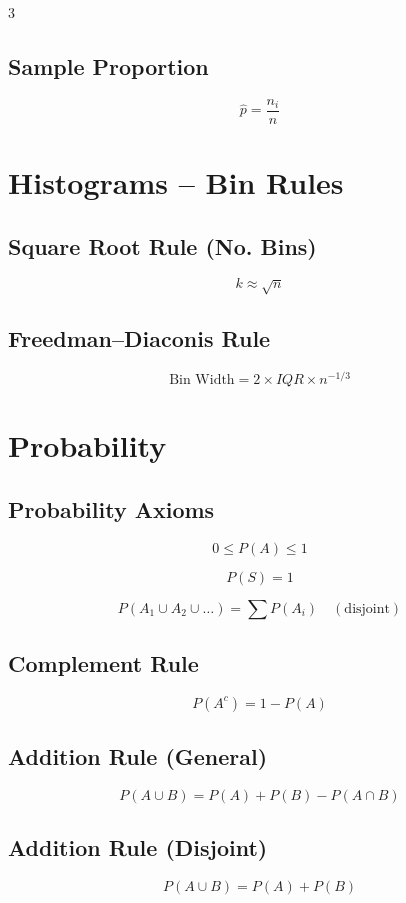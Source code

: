 \documentclass[10pt]{article}
\begin{document}
\begin{multicols}{3}
\subsection*{Sample Proportion}
\[
\hat{p} = \frac{n_i}{n}
\]

\section*{Histograms – Bin Rules}

\subsection*{Square Root Rule (No. Bins)}
\[
k \approx \sqrt{n}
\]

\subsection*{Freedman–Diaconis Rule}
\[
\text{Bin Width} = 2 \times IQR \times n^{-1/3}
\]

\section*{Probability}

\subsection*{Probability Axioms}

\[
0 \le P(A) \le 1
\]

\[
P(S) = 1
\]

\[
P(A_1 \cup A_2 \cup \dots) = \sum P(A_i)
\quad (\text{disjoint})
\]

\subsection*{Complement Rule}
\[
P(A^c) = 1 - P(A)
\]

\subsection*{Addition Rule (General)}
\[
P(A \cup B) = P(A) + P(B) - P(A \cap B)
\]

\subsection*{Addition Rule (Disjoint)}
\[
P(A \cup B) = P(A) + P(B)
\]


\end{multicols}
\end{document}
